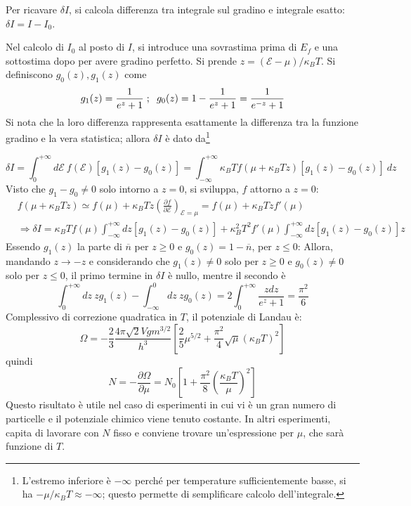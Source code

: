 \documentclass[10pt, a4paper]{scrartcl}
\numberwithin{equation}{subsection}
\theoremstyle{style1}
\theoremstyle{style2}
\begin{document}
Per ricavare $\delta I$, si calcola differenza tra integrale sul gradino e integrale esatto: $\delta I = I - I_0$.

Nel calcolo di $I_0$ al posto di $I$, si introduce una sovrastima prima di $E_f$ e una sottostima dopo per avere gradino perfetto. Si prende $z = (\mathscr{E} - \mu ) / \kappa _B T $. Si definiscono $g_0(z), g_1(z)$ come
\[
	g_1 (z) = \frac{1}{e^z +1} \hspace{.1cm} ; \hspace{.2cm} g_0(z) = 1 - \frac{1}{e^z +1} = \frac{1}{e^{-z}  +1}
\] 
Si nota che la loro differenza rappresenta esattamente la differenza tra la funzione gradino e la vera statistica; allora $\delta I$ \`e dato da\footnote{L'estremo inferiore \`e $-\infty$ perch\'e per temperature sufficientemente basse, si ha $- \mu  / \kappa _B T \approx - \infty$; questo permette di semplificare calcolo dell'integrale.}

\[
\delta I = \int_{0} ^{+\infty} d \mathscr{E} \ f(\mathscr{E}) \left[ g_1(z) - g_0(z) \right] = \int_{-\infty} ^{+\infty} \kappa _B T f(\mu +\kappa _B T z) \left[ g_1(z) - g_0(z) \right]  \ dz
\] 
Visto che $g_1-g_0 \neq 0$ solo intorno a $z=0$, si sviluppa, $f$ attorno a $z=0$:
\[
	\begin{split}
		&f(\mu  + \kappa _B T z) \simeq f(\mu ) + \kappa _B T z \left(\frac{\partial f}{\partial \mathscr{E}} \right) _{\mathscr{E} = \mu } = f(\mu ) + \kappa _B T zf '(\mu )\\
		& \Rightarrow \delta I = \kappa _B T f(\mu ) \int_{-\infty} ^{+\infty} dz \left[ g_1(z) - g_0(z) \right] + \kappa _B^2 T^2 f'(\mu ) \int_{-\infty} ^{+\infty} dz \left[ g_1(z) - g_0(z) \right] z
	\end{split}
\] 
Essendo $g_1(z)$ la parte di $\overline{n}$ per $z\ge 0$ e $g_0(z)=1 - \overline{n}$, per $z\le 0$:
Allora, mandando $z\to - z$ e considerando che $g_1(z) \neq 0 $ solo per $z\ge 0$ e $g_0(z) \neq 0$ solo per $z \le 0$, il primo termine in $\delta I$ \`e nullo, mentre il secondo \`e
\[
\int_{0} ^{+\infty} dz \ z g_1(z) - \int_{-\infty} ^0 dz \ z g_0(z) = 2 \int_{0} ^{+\infty} \frac{z dz}{e^z + 1}= \frac{\pi^2 }{6}
\] 
Complessivo di correzione quadratica in $T$, il potenziale di Landau \`e:
\begin{equation}
	\Omega = -\frac{2}{3} \frac{4 \pi \sqrt{2} V g m^{ 3 /2 } }{h^3}\left[ \frac{2}{5} \mu ^{5 / 2} + \frac{\pi^2 }{4} \sqrt{\mu } (\kappa _B  T )^2  \right] 
\end{equation}
quindi 
\begin{equation}
	N = - \frac{\partial \Omega }{\partial \mu } = N_0 \left[ 1 + \frac{\pi^2}{8} \left(\frac{\kappa _B T}{\mu }\right) ^2 \right] 
\end{equation}
Questo risultato è utile nel caso di esperimenti in cui vi \`e un gran numero di particelle e il potenziale chimico viene tenuto costante.
In altri esperimenti, capita di lavorare con $N$ fisso e conviene trovare un'espressione per $\mu $, che sarà funzione di $T$.
\end{document}
